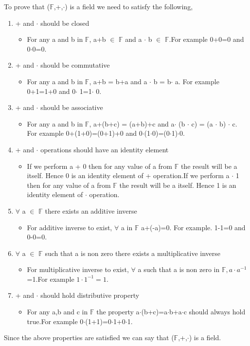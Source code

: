 
  To prove that ($\mathbb{F}$,+,$\cdot$) is a field we need to satisfy the following,
 \begin{enumerate}
\item{+ and $\cdot$ should be closed}
\begin{itemize}
\item For any a and b in $\mathbb{F}$, a+b $\in$ $\mathbb{F}$ and a $\cdot$ b $\in$ $\mathbb{F}$.For example 0+0=0 and 0$\cdot$0=0.
\end{itemize}
\item{+ and $\cdot$ should be commutative}
\begin{itemize}
\item For any a and b in $\mathbb{F}$, a+b = b+a and a $\cdot$ b = b$\cdot$ a. For example 0+1=1+0 and 0$\cdot$ 1=1$\cdot$ 0.
\end{itemize}
\item{+ and $\cdot$ should be associative}
\begin{itemize}
\item For any a and b in $\mathbb{F}$, a+(b+c) = (a+b)+c and a$\cdot$ (b $\cdot$ c) =  (a $\cdot$ b) $\cdot$ c. For example 0+(1+0)=(0+1)+0 and 0$\cdot$(1$\cdot$0)=(0$\cdot$1)$\cdot$0. 
\end{itemize}
\item{+ and $\cdot$ operations should have an identity element}
\begin{itemize}
\item If we perform a + 0 then for any value of a from $\mathbb{F}$ the result will be a itself. Hence 0 is an identity element of + operation.If we perform a $\cdot$ 1 then for any value of a from $\mathbb{F}$ the result will be a itself. Hence 1 is an identity element of $\cdot$ operation. 
\end{itemize}
\item{$\forall$ a $\in$ $\mathbb{F}$ there exists an additive inverse}
\begin{itemize}
\item For additive inverse to exist, $\forall$ a in $\mathbb{F}$ a+(-a)=0. For example. 1-1=0 and 0-0=0.
\end{itemize}
\item{$\forall$ a $\in$ $\mathbb{F}$ such that a is non zero there exists a multiplicative inverse}
\begin{itemize}
\item 
For multiplicative inverse to exist, $\forall$ a such that a is non zero in $\mathbb{F},  a\cdot a^{-1}$=1.For example $1\cdot 1^{-1}=1$.
\end{itemize}
\item{+ and $\cdot$ should hold distributive property}
\begin{itemize}
\item For any a,b and c in $\mathbb{F}$ the property a$\cdot$(b+c)=a$\cdot$b+a$\cdot$c should always hold true.For example 0$\cdot$(1+1)=0$\cdot$1+0$\cdot$1.
\end{itemize}
\end{enumerate}
Since the above properties are satisfied we can say that ($\mathbb{F}$,+,$\cdot$) is a field.
